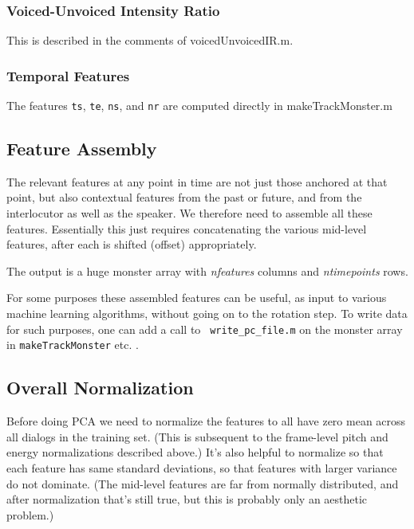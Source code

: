 \documentclass[11pt]{article}
\begin{document}
\subsubsection{Voiced-Unvoiced Intensity Ratio}

This is described in the comments of voicedUnvoicedIR.m.

\subsubsection{Temporal Features}

The features {\tt ts}, {\tt te}, {\tt ns}, and {\tt nr} are computed
directly in makeTrackMonster.m

\subsection{Feature Assembly}

The relevant features at any point in time are not just those anchored
at that point, but also contextual features from the past or future,
and from the interlocutor as well as the speaker.  We therefore need
to assemble all these features.  Essentially this just requires
concatenating the various mid-level features, after each is shifted
(offset) appropriately.

The output is a huge monster array with {\it nfeatures} columns and
{\it ntimepoints} rows.

For some purposes these assembled features can be useful, as input to
various machine learning algorithms, without going on to the rotation
step.  To write data for such purposes, one can add a call to {\tt
  write\_pc\_file.m} on the monster array in {\tt makeTrackMonster}
etc. .


\subsection{Overall Normalization}

Before doing PCA we need to normalize the features to all have zero
mean across all dialogs in the training set.  (This is subsequent to
the frame-level pitch and energy normalizations described above.)
It's also helpful to normalize so that each feature has same standard
deviations, so that features with larger variance do not dominate.
(The mid-level features are far from normally distributed, and after
normalization that's still true, but this is probably only an
aesthetic problem.)
\end{document}
